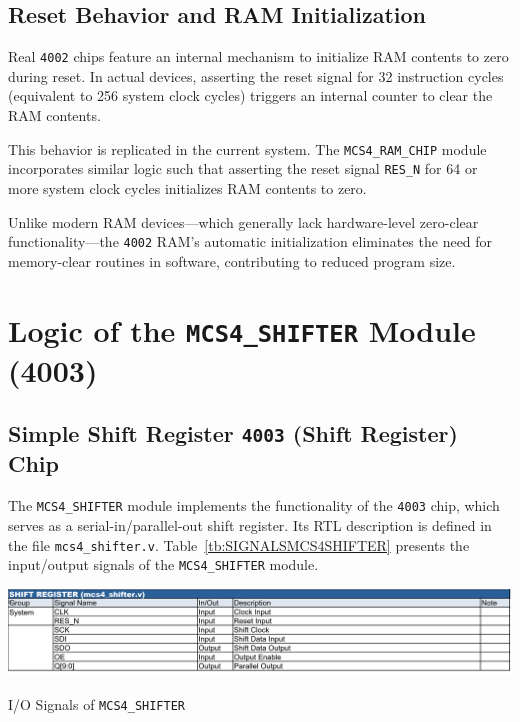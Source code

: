 \subsection{Reset Behavior and RAM Initialization}
Real \texttt{4002} chips feature an internal mechanism to initialize RAM contents to zero during reset.  
In actual devices, asserting the reset signal for 32 instruction cycles (equivalent to 256 system clock cycles) triggers an internal counter to clear the RAM contents.

This behavior is replicated in the current system.  
The \texttt{MCS4\_RAM\_CHIP} module incorporates similar logic such that asserting the reset signal \texttt{RES\_N} for 64 or more system clock cycles initializes RAM contents to zero.

Unlike modern RAM devices—which generally lack hardware-level zero-clear functionality—the \texttt{4002} RAM's automatic initialization eliminates the need for memory-clear routines in software, contributing to reduced program size.

\section{Logic of the \texttt{MCS4\_SHIFTER} Module (4003)}
\subsection{Simple Shift Register \texttt{4003} (Shift Register) Chip}
The \texttt{MCS4\_SHIFTER} module implements the functionality of the \texttt{4003} chip, which serves as a serial-in/parallel-out shift register. Its RTL description is defined in the file \texttt{mcs4\_shifter.v}.
Table~\ref{tb:SIGNALSMCS4SHIFTER} presents the input/output signals of the \texttt{MCS4\_SHIFTER} module.

\begin{table}[htbp]
    \includegraphics[width=1.00\columnwidth]{./Table/SignalsMCS4SHIFTER.png}
    \caption{I/O Signals of \texttt{MCS4\_SHIFTER}}
    \label{tb:SIGNALSMCS4SHIFTER}
\end{table}

